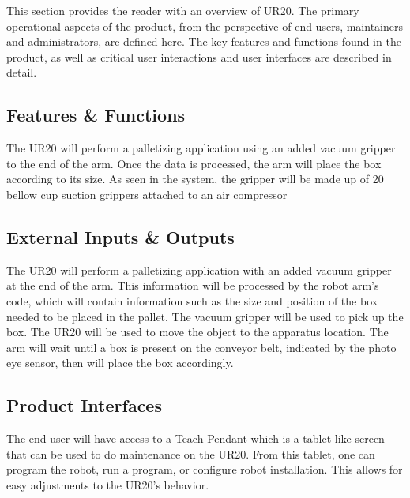 This section provides the reader with an overview of UR20. The primary operational aspects of the product, from the perspective of end users, maintainers and administrators, are defined here. The key features and functions found in the product, as well as critical user interactions and user interfaces are described in detail.

\subsection{Features \& Functions}
The UR20 will perform a palletizing application using an added vacuum gripper to the end of the arm. Once the data is processed, the arm will place the box according to its size. As seen in the system, the gripper will be made up of 20 bellow cup suction grippers  attached to an air compressor

\subsection{External Inputs \& Outputs}
The UR20 will perform a palletizing application with an added vacuum gripper at the end of the arm. This information will be processed by the robot arm's code, which will contain information such as the size and position of the box needed to be placed in the pallet. The vacuum gripper will be used to pick up the box. The UR20 will be used to move the object to the apparatus location.  The arm will wait until a box is present on the conveyor belt, indicated by the photo eye sensor, then will place the box accordingly. 

\subsection{Product Interfaces}
The end user will have access to a Teach Pendant which is a tablet-like screen that can be used to do maintenance on the UR20. From this tablet, one can program the robot, run a program, or configure robot installation. This allows for easy adjustments to the UR20's behavior.
